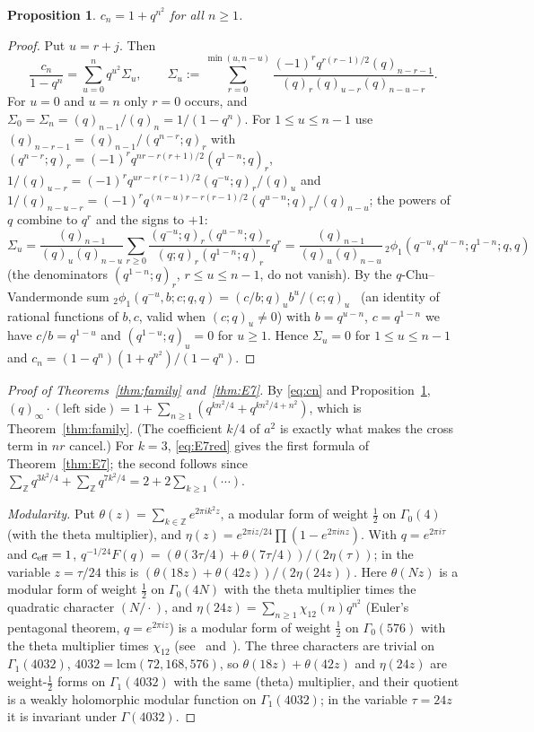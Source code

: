 \documentclass[11pt]{amsart}
\newtheorem{proposition}[theorem]{Proposition}
\theoremstyle{definition}
\numberwithin{equation}{section}
\newcommand{\Z}{\mathbb{Z}}
\begin{document}
\begin{proposition}\label{prop:cn}
$c_n=1+q^{n^2}$ for all $n\ge1$.
\end{proposition}
\begin{proof}
Put $u=r+j$. Then
\[
\frac{c_n}{1-q^n}=\sum_{u=0}^nq^{u^2}\Sigma_u,\qquad
\Sigma_u:=\sum_{r=0}^{\min(u,n-u)}\frac{(-1)^rq^{r(r-1)/2}(q)_{n-r-1}}{(q)_r(q)_{u-r}(q)_{n-u-r}} .
\]
For $u=0$ and $u=n$ only $r=0$ occurs, and $\Sigma_0=\Sigma_n=(q)_{n-1}/(q)_n=1/(1-q^n)$. For $1\le u\le n-1$ use
$(q)_{n-r-1}=(q)_{n-1}/(q^{n-r};q)_r$ with $(q^{n-r};q)_r=(-1)^rq^{nr-r(r+1)/2}(q^{1-n};q)_r$,
$1/(q)_{u-r}=(-1)^rq^{ur-r(r-1)/2}(q^{-u};q)_r/(q)_u$ and $1/(q)_{n-u-r}=(-1)^rq^{(n-u)r-r(r-1)/2}(q^{u-n};q)_r/(q)_{n-u}$;
the powers of $q$ combine to $q^r$ and the signs to $+1$:
\[
\Sigma_u=\frac{(q)_{n-1}}{(q)_u(q)_{n-u}}\sum_{r\ge0}\frac{(q^{-u};q)_r(q^{u-n};q)_r}{(q;q)_r(q^{1-n};q)_r}q^r
=\frac{(q)_{n-1}}{(q)_u(q)_{n-u}}\,{}_2\phi_1(q^{-u},q^{u-n};q^{1-n};q,q)
\]
(the denominators $(q^{1-n};q)_r$, $r\le u\le n-1$, do not vanish). By the $q$-Chu--Vandermonde sum
${}_2\phi_1(q^{-u},b;c;q,q)=(c/b;q)_ub^u/(c;q)_u$~\cite[(1.5.3)]{GR} (an identity of rational functions of
$b,c$, valid when $(c;q)_u\ne0$) with $b=q^{u-n}$, $c=q^{1-n}$ we have $c/b=q^{1-u}$ and
$(q^{1-u};q)_u=0$ for $u\ge1$. Hence $\Sigma_u=0$ for $1\le u\le n-1$ and $c_n=(1-q^n)(1+q^{n^2})/(1-q^n)$.
\end{proof}

\begin{proof}[Proof of Theorems~\ref{thm:family} and~\ref{thm:E7}]
By \eqref{eq:cn} and Proposition~\ref{prop:cn},
$(q)_\infty\cdot(\text{left side})=1+\sum_{n\ge1}(q^{kn^2/4}+q^{kn^2/4+n^2})$, which is
Theorem~\ref{thm:family}. (The coefficient $k/4$ of $a^2$ is exactly what makes the cross term in $nr$
cancel.) For $k=3$, \eqref{eq:E7red} gives the first formula of Theorem~\ref{thm:E7}; the second follows
since $\sum_{\Z}q^{3k^2/4}+\sum_\Z q^{7k^2/4}=2+2\sum_{k\ge1}(\cdots)$.

\emph{Modularity.} Put $\theta(z)=\sum_{k\in\Z}e^{2\pi ik^2z}$, a modular form of weight $\frac12$ on
$\Gamma_0(4)$ (with the theta multiplier), and $\eta(z)=e^{2\pi iz/24}\prod(1-e^{2\pi inz})$. With
$q=e^{2\pi i\tau}$ and $c_{\rm eff}=1$, $q^{-1/24}F(q)=(\theta(3\tau/4)+\theta(7\tau/4))/(2\eta(\tau))$; in the
variable $z=\tau/24$ this is $(\theta(18z)+\theta(42z))/(2\eta(24z))$. Here $\theta(Nz)$ is a modular form of
weight $\frac12$ on $\Gamma_0(4N)$ with the theta multiplier times the quadratic character $(N/\cdot)$, and
$\eta(24z)=\sum_{n\ge1}\chi_{12}(n)q^{n^2}$ (Euler's pentagonal theorem, $q=e^{2\pi iz}$) is a modular form of
weight $\frac12$ on $\Gamma_0(576)$ with the theta multiplier times $\chi_{12}$ (see~\cite{Shimura}
and~\cite[Ch.~1]{Ono}). The three characters are trivial on $\Gamma_1(4032)$,
$4032=\mathrm{lcm}(72,168,576)$, so $\theta(18z)+\theta(42z)$ and $\eta(24z)$ are weight-$\frac12$ forms on
$\Gamma_1(4032)$ with the same (theta) multiplier, and their quotient is a weakly holomorphic modular function
on $\Gamma_1(4032)$; in the variable $\tau=24z$ it is invariant under $\Gamma(4032)$.
\end{proof}
\end{document}
